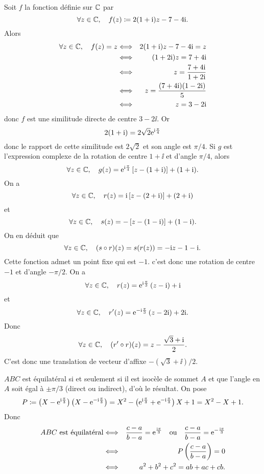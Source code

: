 \documentclass{magnolia}
\begin{document}
\begin{sol}
\begin{questions}
\question Soit $f$ la fonction définie sur $\mathbb{C}$ par
\[\forall z\in\mathbb{C},\quad f(z)\coloneqq 2(1+{\rm i})z-7-4{\rm i}.\]
Alors
\begin{eqnarray*}
\forall z\in\mathbb{C},\quad f(z)=z
&\Longleftrightarrow& 2(1+{\rm i})z-7-4{\rm i}=z\\
&\Longleftrightarrow& (1+2{\rm i})z=7+4{\rm i}\\
&\Longleftrightarrow& z=\frac{7+4{\rm i}}{1+2{\rm i}}\\
&\Longleftrightarrow& z=\frac{(7+4{\rm i})(1-2{\rm i})}{5}\\
&\Longleftrightarrow& z=3-2{\rm i}
\end{eqnarray*}
donc $f$ est une similitude directe de centre $3-2\ii$. Or
\[2(1+{\rm i})=2\sqrt{2}{\rm e}^{{\rm i}\frac{\pi}{4}}\]
donc le rapport de cette similitude est $2\sqrt{2}$ et son angle est $\pi/4$.
\question Si $g$ est l'expression complexe de la rotation de centre $1+\ii$ et d'angle $\pi/4$, alors
\[\forall z\in\mathbb{C},\quad g(z)={\rm e}^{{\rm i}\frac{\pi}{4}}\left[z-(1+{\rm i})\right]+(1+{\rm i}).\]
\question On a 
\[\forall z\in\mathbb{C},\quad r(z)={\rm i}\left[z-(2+{\rm i})\right]+(2+{\rm i})\]
et
\[\forall z\in\mathbb{C},\quad s(z)=-\left[z-(1-{\rm i})\right]+(1-{\rm i}).\]
On en déduit que
\[\forall z\in\mathbb{C},\quad (s\circ r)(z)=s(r(z))=-{\rm i} z-1-{\rm i}.\]
Cette fonction admet un point fixe qui est $-1$. c'est donc une rotation de centre $-1$ et d'angle $-\pi/2$.
\question On a
\[\forall z\in\mathbb{C},\quad r(z)={\rm e}^{{\rm i}\frac{\pi}{3}}\left(z-{\rm i}\right)+{\rm i}\]
et
\[\forall z\in\mathbb{C},\quad r'(z)={\rm e}^{-{\rm i}\frac{\pi}{3}}\left(z-2{\rm i}\right)+2{\rm i}.\]
Donc
\[\forall z\in\mathbb{C},\quad (r'\circ r)(z)=z-\frac{\sqrt {3}+{\rm i}}{2}.\]
C'est donc une translation de vecteur d'affixe $-(\sqrt{3}+\ii)/2$.
\end{questions}
\end{sol}

\begin{sol}
\begin{questions}
\question $ABC$ est équilatéral si et seulement si il est isocèle de sommet $A$ et que l'angle en $A$ soit égal à $\pm\pi/3$ (direct ou indirect), d'où le résultat.
\question On pose
  \[P\coloneqq\left(X-{\rm e}^{{\rm i}\frac{\pi}{3}}\right)\left(X-{\rm e}^{-{\rm i}\frac{\pi}{3}}\right)=X^2-\left({\rm e}^{{\rm i}\frac{\pi}{3}}+{\rm e}^{-{\rm i}\frac{\pi}{3}}\right)X+1=X^2-X+1.\]
Donc
\begin{eqnarray*}
\text{$ABC$ est équilatéral} &\Longleftrightarrow & \frac{c-a}{b-a}={\rm e}^{\frac{{\rm i}\pi}{3}} \quad\text{ou}\quad \frac{c-a}{b-a}={\rm e}^{-\frac{{\rm i}\pi}{3}}\\
&\Longleftrightarrow & P\left(\frac{c-a}{b-a}\right)=0\\
&\Longleftrightarrow &a^2+b^2+c^2=ab+ac+cb.
\end{eqnarray*}
\end{questions}
\end{sol}



\end{document}

